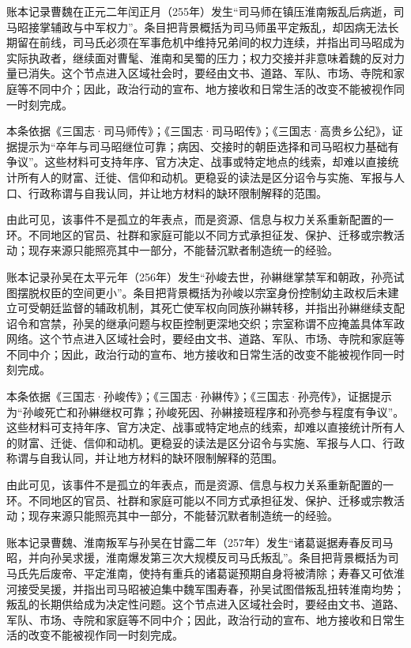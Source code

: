 账本记录曹魏在正元二年闰正月（255年）发生“司马师在镇压淮南叛乱后病逝，司马昭接掌辅政与中军权力”。条目把背景概括为司马师虽平定叛乱，却因病无法长期留在前线，司马氏必须在军事危机中维持兄弟间的权力连续，并指出司马昭成为实际执政者，继续面对曹髦、淮南和吴蜀的压力；权力交接并非意味着魏的反对力量已消失。这个节点进入区域社会时，要经由文书、道路、军队、市场、寺院和家庭等不同中介；因此，政治行动的宣布、地方接收和日常生活的改变不能被视作同一时刻完成。

本条依据《三国志·司马师传》；《三国志·司马昭传》；《三国志·高贵乡公纪》，证据提示为“卒年与司马昭继位可靠；病因、交接时的朝臣选择和司马昭权力基础有争议”。这些材料可支持年序、官方决定、战事或特定地点的线索，却难以直接统计所有人的财富、迁徙、信仰和动机。更稳妥的读法是区分诏令与实施、军报与人口、行政称谓与自我认同，并让地方材料的缺环限制解释的范围。

由此可见，该事件不是孤立的年表点，而是资源、信息与权力关系重新配置的一环。不同地区的官员、社群和家庭可能以不同方式承担征发、保护、迁移或宗教活动；现存来源只能照亮其中一部分，不能替沉默者制造统一的经验。

账本记录孙吴在太平元年（256年）发生“孙峻去世，孙綝继掌禁军和朝政，孙亮试图摆脱权臣的空间更小”。条目把背景概括为孙峻以宗室身份控制幼主政权后未建立可受朝廷监督的辅政机制，其死亡使军权向同族孙綝转移，并指出孙綝继续支配诏令和宫禁，孙吴的继承问题与权臣控制更深地交织；宗室称谓不应掩盖具体军政网络。这个节点进入区域社会时，要经由文书、道路、军队、市场、寺院和家庭等不同中介；因此，政治行动的宣布、地方接收和日常生活的改变不能被视作同一时刻完成。

本条依据《三国志·孙峻传》；《三国志·孙綝传》；《三国志·孙亮传》，证据提示为“孙峻死亡和孙綝继权可靠；孙峻死因、孙綝接班程序和孙亮参与程度有争议”。这些材料可支持年序、官方决定、战事或特定地点的线索，却难以直接统计所有人的财富、迁徙、信仰和动机。更稳妥的读法是区分诏令与实施、军报与人口、行政称谓与自我认同，并让地方材料的缺环限制解释的范围。

由此可见，该事件不是孤立的年表点，而是资源、信息与权力关系重新配置的一环。不同地区的官员、社群和家庭可能以不同方式承担征发、保护、迁移或宗教活动；现存来源只能照亮其中一部分，不能替沉默者制造统一的经验。

账本记录曹魏、淮南叛军与孙吴在甘露二年（257年）发生“诸葛诞据寿春反司马昭，并向孙吴求援，淮南爆发第三次大规模反司马氏叛乱”。条目把背景概括为司马氏先后废帝、平定淮南，使持有重兵的诸葛诞预期自身将被清除；寿春又可依淮河接受吴援，并指出司马昭被迫集中魏军围寿春，孙吴试图借叛乱扭转淮南均势；叛乱的长期供给成为决定性问题。这个节点进入区域社会时，要经由文书、道路、军队、市场、寺院和家庭等不同中介；因此，政治行动的宣布、地方接收和日常生活的改变不能被视作同一时刻完成。

